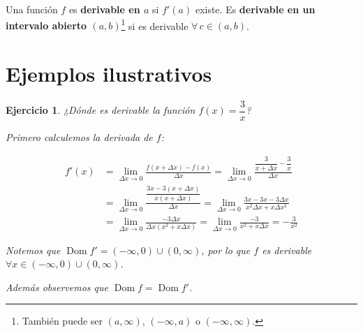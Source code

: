 \documentclass[12pt,tikz,border=5pt]{article}
\newtheorem{ejercicio}{Ejercicio}[section]
\begin{document}
Una función $f$ es \textbf{derivable en $a$} si $f'(a)$ existe. Es
\textbf{derivable en un intervalo abierto $(a,b)$}\footnote{También puede
ser $(a,\infty)$, $(-\infty,a)$ o $(-\infty,\infty)$.} si es derivable
$\forall\, c\in(a,b)$.

\section{Ejemplos ilustrativos}

\begin{ejercicio}
¿Dónde es derivable la función $f(x) = \dfrac{3}{x}$?

Primero calculemos la derivada de $f$:

\begin{align*}
f'(x) &= \lim_{\Delta x\to 0}\frac{f(x+\Delta x)-f(x)}{\Delta x} = \lim_{\Delta x\to 0}\frac{\dfrac{3}{x+\Delta x}-\dfrac{3}{x}}{\Delta x} \\[4pt]
&= \lim_{\Delta x\to 0}\frac{\dfrac{3x-3(x+\Delta x)}{x(x+\Delta x)}}{\Delta x} = \lim_{\Delta x\to 0}\frac{3x-3x-3\Delta x}{x^2\Delta x+x\Delta x^2} \\[4pt]
&= \lim_{\Delta x\to 0}\frac{-3\Delta x}{\Delta x(x^2+x\Delta x)} = \lim_{\Delta x\to 0}\frac{-3}{x^2+x\Delta x} = -\frac{3}{x^2}
\end{align*}

Notemos que $\operatorname{Dom} f' = (-\infty,0)\cup(0,\infty)$, por lo que
$f$ es derivable $\forall x\in(-\infty,0)\cup(0,\infty)$.

Además observemos que $\operatorname{Dom} f = \operatorname{Dom} f'$.
\end{ejercicio}
\end{document}

